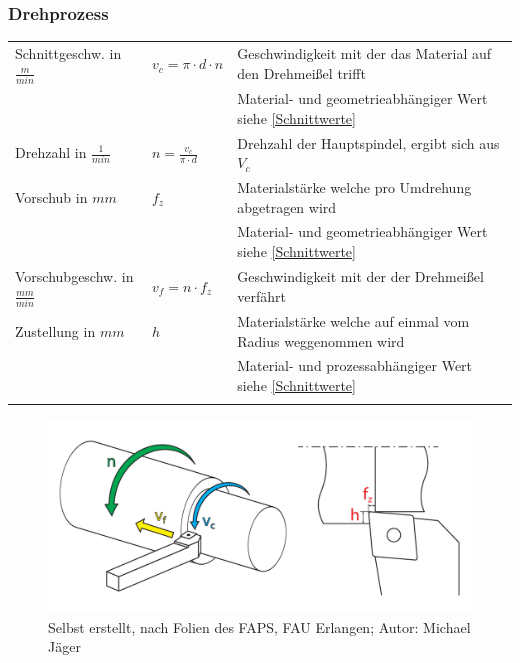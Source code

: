 \documentclass{\basedir/fablab-document}
\begin{document}
\subsubsection{Drehprozess}
\begin{tabular}{lll}
    Schnittgeschw. in $\frac{m}{min}$ 					& $v_c = \pi \cdot d \cdot n $ 			& Geschwindigkeit mit der das Material auf den Drehmeißel trifft 	\\ 
																								&																		& Material- und geometrieabhängiger Wert siehe \ref{Schnittwerte} \\ \addlinespace
		Drehzahl in $\frac{1}{min}$ 								& $ n = \frac{v_c}{\pi \cdot d} $		& Drehzahl der Hauptspindel, ergibt sich aus $V_c$								\\ \addlinespace
		Vorschub in $mm$ 														& $ f_z $  													& Materialstärke welche pro Umdrehung abgetragen wird 						\\
																								&																		& Material- und geometrieabhängiger Wert siehe \ref{Schnittwerte} \\ \addlinespace
		Vorschubgeschw. in $\frac{mm}{min}$ 				& $ v_f = n \cdot f_z $ 						& Geschwindigkeit mit der der Drehmeißel verfährt			 						\\ \addlinespace
		Zustellung in $mm$ 													& $ h  $  													& Materialstärke welche auf einmal vom Radius weggenommen wird		\\
																								&																		& Material- und prozessabhängiger Wert siehe \ref{Schnittwerte} 	\\ \addlinespace
\end{tabular}

\begin{figure}[ht]
\centering
\includegraphics[width = 0.9\linewidth]{img/drehprozess}
\caption{Selbst erstellt, nach Folien des FAPS, FAU Erlangen; Autor: Michael Jäger}
\end{figure}
\end{document}
